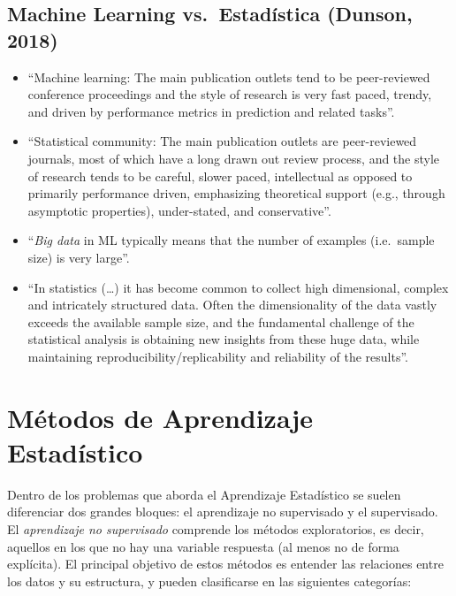 \documentclass[
]{book}
\theoremstyle{break}
\theoremstyle{definition}
\theoremstyle{definition}
\theoremstyle{definition}
\theoremstyle{definition}
\theoremstyle{remark}
\begin{document}
\hypertarget{machine-learning-vs.-estaduxedstica-dunson-2018}{%
\subsection{Machine Learning vs.~Estadística (Dunson, 2018)}\label{machine-learning-vs.-estaduxedstica-dunson-2018}}

\begin{itemize}
\item
  ``Machine learning: The main publication outlets tend to be peer-reviewed conference proceedings and the style of research is very fast paced, trendy, and driven by performance metrics in prediction and related tasks''.
\item
  ``Statistical community: The main publication outlets are peer-reviewed journals, most of which have a long drawn out review process, and the style of research tends to be careful, slower paced, intellectual as opposed to primarily performance driven, emphasizing theoretical support (e.g., through asymptotic properties), under-stated, and conservative''.
\item
  ``\emph{Big data} in ML typically means that the number of examples (i.e.~sample size) is very large''.
\item
  ``In statistics (\ldots) it has become common to collect high dimensional, complex and intricately structured data. Often the dimensionality of the data vastly exceeds the available sample size, and the fundamental challenge of the statistical analysis is obtaining new insights from these huge data, while maintaining reproducibility/replicability and reliability of the results''.
\end{itemize}

\hypertarget{muxe9todos-de-aprendizaje-estaduxedstico}{%
\section{Métodos de Aprendizaje Estadístico}\label{muxe9todos-de-aprendizaje-estaduxedstico}}

Dentro de los problemas que aborda el Aprendizaje Estadístico se suelen diferenciar dos grandes bloques: el aprendizaje no supervisado y el supervisado. El \emph{aprendizaje no supervisado} comprende los métodos exploratorios, es decir, aquellos en los que no hay una variable respuesta (al menos no de forma explícita). El principal objetivo de estos métodos es entender las relaciones entre los datos y su estructura, y pueden clasificarse en las siguientes categorías:
\end{document}
